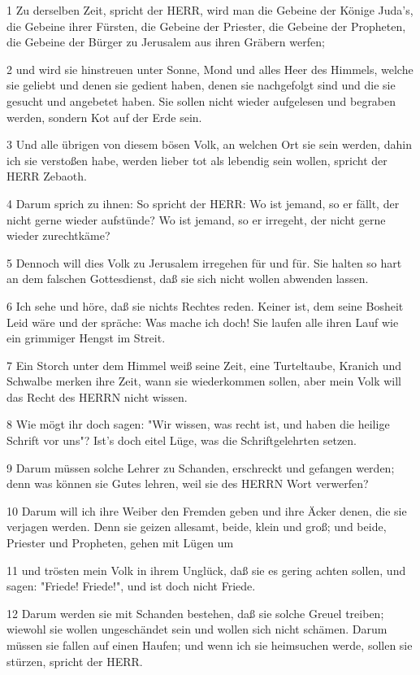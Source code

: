 \par 1 Zu derselben Zeit, spricht der HERR, wird man die Gebeine der Könige Juda's, die Gebeine ihrer Fürsten, die Gebeine der Priester, die Gebeine der Propheten, die Gebeine der Bürger zu Jerusalem aus ihren Gräbern werfen;
\par 2 und wird sie hinstreuen unter Sonne, Mond und alles Heer des Himmels, welche sie geliebt und denen sie gedient haben, denen sie nachgefolgt sind und die sie gesucht und angebetet haben. Sie sollen nicht wieder aufgelesen und begraben werden, sondern Kot auf der Erde sein.
\par 3 Und alle übrigen von diesem bösen Volk, an welchen Ort sie sein werden, dahin ich sie verstoßen habe, werden lieber tot als lebendig sein wollen, spricht der HERR Zebaoth.
\par 4 Darum sprich zu ihnen: So spricht der HERR: Wo ist jemand, so er fällt, der nicht gerne wieder aufstünde? Wo ist jemand, so er irregeht, der nicht gerne wieder zurechtkäme?
\par 5 Dennoch will dies Volk zu Jerusalem irregehen für und für. Sie halten so hart an dem falschen Gottesdienst, daß sie sich nicht wollen abwenden lassen.
\par 6 Ich sehe und höre, daß sie nichts Rechtes reden. Keiner ist, dem seine Bosheit Leid wäre und der spräche: Was mache ich doch! Sie laufen alle ihren Lauf wie ein grimmiger Hengst im Streit.
\par 7 Ein Storch unter dem Himmel weiß seine Zeit, eine Turteltaube, Kranich und Schwalbe merken ihre Zeit, wann sie wiederkommen sollen, aber mein Volk will das Recht des HERRN nicht wissen.
\par 8 Wie mögt ihr doch sagen: "Wir wissen, was recht ist, und haben die heilige Schrift vor uns"? Ist's doch eitel Lüge, was die Schriftgelehrten setzen.
\par 9 Darum müssen solche Lehrer zu Schanden, erschreckt und gefangen werden; denn was können sie Gutes lehren, weil sie des HERRN Wort verwerfen?
\par 10 Darum will ich ihre Weiber den Fremden geben und ihre Äcker denen, die sie verjagen werden. Denn sie geizen allesamt, beide, klein und groß; und beide, Priester und Propheten, gehen mit Lügen um
\par 11 und trösten mein Volk in ihrem Unglück, daß sie es gering achten sollen, und sagen: "Friede! Friede!", und ist doch nicht Friede.
\par 12 Darum werden sie mit Schanden bestehen, daß sie solche Greuel treiben; wiewohl sie wollen ungeschändet sein und wollen sich nicht schämen. Darum müssen sie fallen auf einen Haufen; und wenn ich sie heimsuchen werde, sollen sie stürzen, spricht der HERR.
